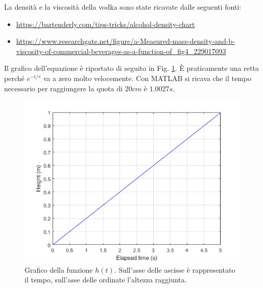 \documentclass{article}
\begin{document}
\noindent La densità e la viscosità della vodka sono state ricavate dalle seguenti fonti:
\begin{itemize}
\item \href{https://bartenderly.com/tips-tricks/alcohol-density-chart}{https://bartenderly.com/tips-tricks/alcohol-density-chart}
\item \href{https://www.researchgate.net/figure/a-Measured-mass-density-and-b-viscosity-of-commercial-beverages-as-a-function-of\_fig4\_229017093}{https://www.researchgate.net/figure/a-Measured-mass-density-and-b-viscosity-of-commercial-beverages-as-a-function-of\_fig4\_229017093}
\end{itemize}

Il grafico dell'equazione è riportato di seguito in Fig. \ref{graph}. È praticamente una retta perché $e^{-t/\tau}$ va a zero molto velocemente. Con MATLAB si ricava che il tempo necessario per raggiungere la quota di $20cm$ è $1.0027s$.

\begin{figure}[ht!]
    \centering
    \includegraphics[width=0.8\linewidth]{graph.png}
    \caption{Grafico della funzione $h(t)$. Sull'asse delle ascisse è rappresentato il tempo, sull'asse delle ordinate l'altezza raggiunta.}
    \label{graph}
\end{figure}
\end{document}
